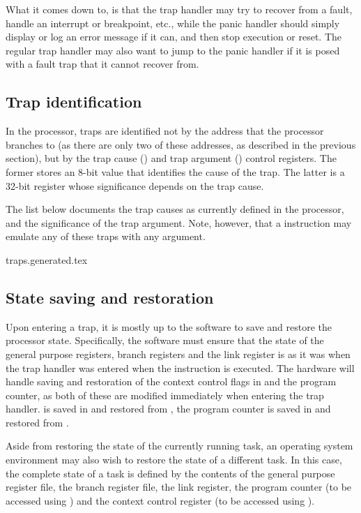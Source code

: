What it comes down to, is that the trap handler may try to recover from a fault,
handle an interrupt or breakpoint, etc., while the panic handler should simply
display or log an error message if it can, and then stop execution or reset. The
regular trap handler may also want to jump to the panic handler if it is posed
with a fault trap that it cannot recover from.

\subsection{Trap identification}
\label{sec:core-ug-traps-ids}

In the \rvex{} processor, traps are identified not by the address that the 
processor branches to (as there are only two of these addresses, as described in 
the previous section), but by the trap cause () and trap argument 
() control registers. The former stores an 8-bit value that identifies 
the cause of the trap. The latter is a 32-bit register whose significance 
depends on the trap cause.

The list below documents the trap causes as currently defined in the processor,
and the significance of the trap argument. Note, however, that a 
instruction may emulate any of these traps with any argument.

{traps.generated.tex}

\subsection{State saving and restoration}
\label{sec:core-ug-traps-save-restore}

Upon entering a trap, it is mostly up to the software to save and restore the
processor state. Specifically, the software must ensure that the state of the
general purpose registers, branch registers and the link register is as it was
when the trap handler was entered when the  instruction is executed.
The hardware will handle saving and restoration of the context control flags in
 and the program counter, as both of these are modified immediately
when entering the trap handler.  is saved in and restored from
, the program counter is saved in and restored from .

Aside from restoring the state of the currently running task, an operating
system environment may also wish to restore the state of a different task. In
this case, the complete state of a task is defined by the contents of the
general purpose register file, the branch register file, the link register, the
program counter (to be accessed using ) and the context control
register (to be accessed using ).

